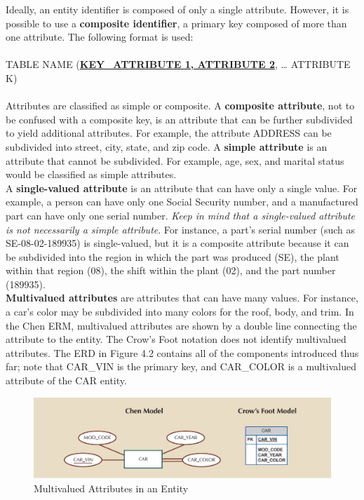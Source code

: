 \documentclass[a4paper, 12pt, titlepage]{report}
\begin{document}
{Ideally, an entity identifier is composed of only a single attribute. However, it is possible to use a \textbf{composite identifier}, a primary key composed of more than one attribute. The following format is used:\\ \\
TABLE NAME (\uline{\textbf{{KEY\_ATTRIBUTE 1, ATTRIBUTE 2}}}, … ATTRIBUTE K)\\ \\
Attributes are classified as simple or composite. A \textbf{composite attribute}, not to be confused with a composite key, is an attribute that can be further subdivided to yield additional attributes. For example, the attribute ADDRESS can be subdivided into street, city, state, and zip code. A \textbf{simple attribute} is an attribute that cannot be subdivided. For example, age, sex, and marital status would be classified as simple attributes.\\
A \textbf{single-valued attribute} is an attribute that can have only a single value. For example, a person can have only one Social Security number, and
a manufactured part can have only one serial number. \emph{Keep in mind that a single-valued attribute is not necessarily a simple attribute}. For instance, a part’s serial number (such as SE-08-02-189935) is single-valued, but it is a composite attribute because it can be subdivided into the region in which the part was produced (SE), the plant within that region (08), the shift within the plant (02), and the part number (189935).\\
\textbf{Multivalued attributes} are attributes that can have many values. For instance, a car’s color may be subdivided into many colors for the roof, body, and trim. In the Chen ERM, multivalued attributes are shown by a double line connecting the attribute to the entity. The Crow’s Foot notation does not identify multivalued attributes. The ERD in Figure 4.2 contains all of the components introduced thus far; note that CAR\_VIN is the primary key, and CAR\_COLOR is a multivalued attribute of the CAR entity.
\begin{figure}[H]
\centering
\includegraphics[scale=0.5]{Attr2}
\caption{Multivalued Attributes in an Entity}

\end{figure}}
\end{document}
